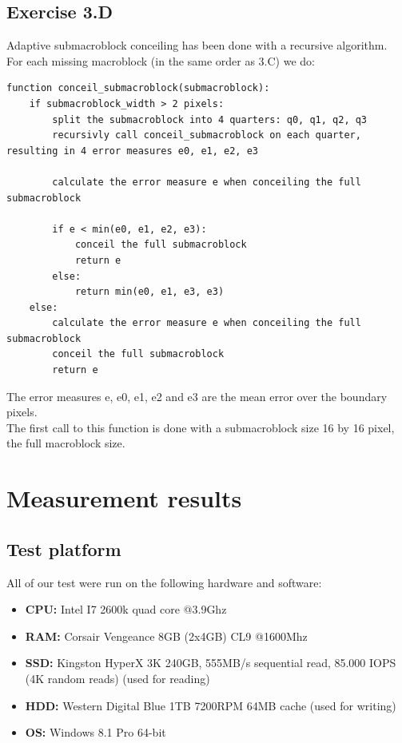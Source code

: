 \documentclass[a4paper,11pt,oneside]{article}
\begin{document}
\subsection*{Exercise 3.D}
\vspace{-0.5cm}
Adaptive submacroblock conceiling has been done with a recursive algorithm.\\
For each missing macroblock (in the same order as 3.C) we do:
\begin{lstlisting}[frame=single]
function conceil_submacroblock(submacroblock):
	if submacroblock_width > 2 pixels:
		split the submacroblock into 4 quarters: q0, q1, q2, q3
		recursivly call conceil_submacroblock on each quarter, resulting in 4 error measures e0, e1, e2, e3
		
		calculate the error measure e when conceiling the full submacroblock
		
		if e < min(e0, e1, e2, e3):
			conceil the full submacroblock
			return e
		else:
			return min(e0, e1, e3, e3)
	else:
		calculate the error measure e when conceiling the full submacroblock
		conceil the full submacroblock
		return e
\end{lstlisting}
\vspace{-1cm}
The error measures e, e0, e1, e2 and e3 are the mean error over the boundary pixels. \\
The first call to this function is done with a submacroblock size 16 by 16 pixel, the full macroblock size.\\

\section{Measurement results}
\vspace{-0.5cm}
\subsection*{Test platform}
\vspace{-0.5cm}
All of our test were run on the following hardware and software:
\begin{itemize}
	\item \textbf{CPU:} Intel I7 2600k quad core @3.9Ghz
	\item \textbf{RAM:} Corsair Vengeance 8GB (2x4GB) CL9 @1600Mhz
	\item \textbf{SSD:} Kingston HyperX 3K 240GB, 555MB/s sequential read, 85.000 IOPS (4K random reads) (used for reading) 
	\item \textbf{HDD:} Western Digital Blue 1TB 7200RPM 64MB cache (used for writing)
	\item \textbf{OS:} Windows 8.1 Pro 64-bit\\
\end{itemize}
\vspace{-1cm}
\end{document}
